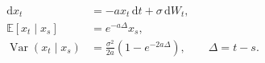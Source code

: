 \documentclass{equation-sheet}
\begin{document}
\begin{equation*}
\begin{aligned}
\mathrm{d}x_t
  &= -a x_t\,\mathrm{d}t + \sigma\,\mathrm{d}W_t, \\[0.45em]
\mathbb{E}[x_t\mid x_s]
  &= e^{-a\Delta}x_s, \\[0.45em]
\operatorname{Var}(x_t\mid x_s)
  &= \frac{\sigma^2}{2a}\left(1-e^{-2a\Delta}\right),
  \qquad \Delta=t-s.
\end{aligned}
\end{equation*}
\end{document}
